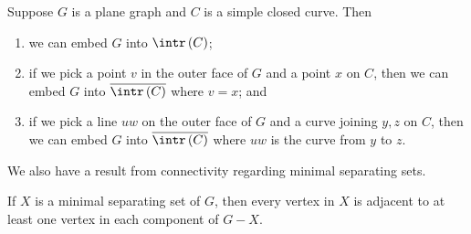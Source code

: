 \documentclass[co342]{subfiles}
\begin{document}
    \begin{lemma_inside}{}
        Suppose $G$ is a plane graph and $C$ is a simple closed curve. Then
            \begin{enumerate}
                \item we can embed $G$ into $\intr\left( C \right)$;
                \item if we pick a point $v$ in the outer face of $G$ and a point $x$ on $C$, then we can embed $G$ into $\overline{\intr\left( C \right)}$ where $v=x$; and
                \item if we pick a line $uw$ on the outer face of $G$ and a curve joining $y,z$ on $C$, then we can embed $G$ into $\overline{\intr\left( C \right)}$ where $uw$ is the curve from $y$ to $z$.
            \end{enumerate}
    \end{lemma_inside}

    \noindent We also have a result from connectivity regarding minimal separating sets.

    \clearpage
    \begin{lemma_inside}{}
        If $X$ is a minimal separating set of $G$, then every vertex in $X$ is adjacent to at least one vertex in each component of $G-X$.
    \end{lemma_inside}
\end{document}
